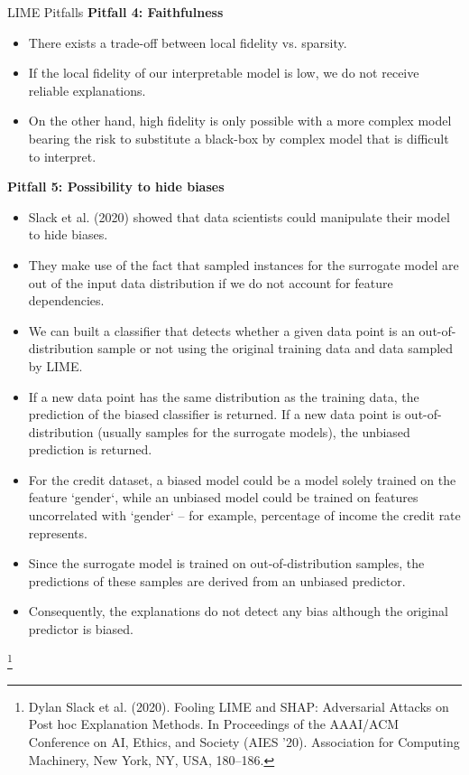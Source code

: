 \documentclass[11pt,compress,t,notes=noshow, xcolor=table]{beamer}
\begin{document}
\begin{vbframe}{LIME Pitfalls}
\textbf{Pitfall 4: Faithfulness}
\begin{itemize}
	\item There exists a trade-off between local fidelity vs. sparsity. 
	\item If the local fidelity of our interpretable model is low, we do not receive reliable explanations.
	\item On the other hand, high fidelity is only possible with a more complex model bearing the risk to substitute a black-box by complex model that is difficult to interpret.
\end{itemize}
\framebreak

\textbf{Pitfall 5: Possibility to hide biases}
\begin{itemize}
	\item Slack et al. (2020) showed that data scientists could manipulate their model to hide biases. 
	\item They make use of the fact that sampled instances for the surrogate model are out of the input data distribution if we do not account for feature dependencies. 
	\item We can built a classifier that detects whether a given data point is an out-of-distribution sample or not using the original training data and data sampled by LIME. 
	\item If a new data point has the same distribution as the training data, the prediction of the biased classifier is returned. If a new data point is out-of-distribution (usually samples for the surrogate models), the unbiased prediction is returned.
	\item For the credit dataset, a biased model could be a model solely trained on the feature `gender`, while an unbiased model could be trained on features uncorrelated with `gender` -- for example, percentage of income the credit rate represents.   
	\item Since the surrogate model is trained on out-of-distribution samples, the predictions of these samples are derived from an unbiased predictor. 
	\item Consequently, the explanations do not detect any bias although the original predictor is biased. 
\end{itemize}
\footnote[frame]{Dylan Slack et al. (2020). Fooling LIME and SHAP: Adversarial Attacks on Post hoc Explanation Methods. In Proceedings of the AAAI/ACM Conference on AI, Ethics, and Society (AIES '20). Association for Computing Machinery, New York, NY, USA, 180–186.}
\end{vbframe}
\end{document}
